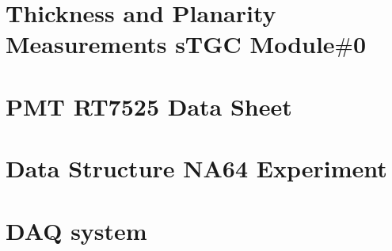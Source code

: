 \section{Thickness and Planarity Measurements sTGC Module$\#$0}
\section{PMT RT7525 Data Sheet}
\section{Data Structure NA64 Experiment}
\section{DAQ system}

